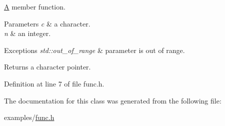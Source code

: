 \hyperlink{class_a}{A} member function. 


\begin{DoxyParams}{Parameters}
{\em c} & a character. \\
\hline
{\em n} & an integer. \\
\hline
\end{DoxyParams}

\begin{DoxyExceptions}{Exceptions}
{\em std\+::out\+\_\+of\+\_\+range} & parameter is out of range. \\
\hline
\end{DoxyExceptions}
\begin{DoxyReturn}{Returns}
a character pointer. 
\end{DoxyReturn}


Definition at line 7 of file func.\+h.



The documentation for this class was generated from the following file\+:\begin{DoxyCompactItemize}
\item 
examples/\hyperlink{func_8h}{func.\+h}\end{DoxyCompactItemize}
